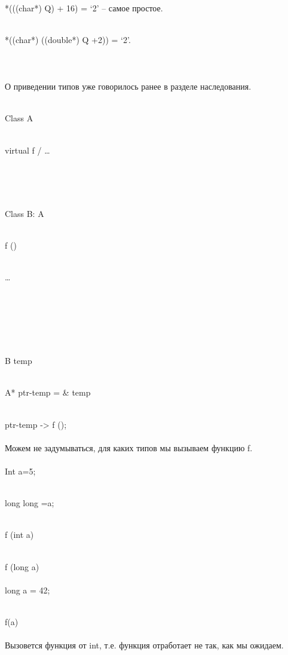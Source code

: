 \documentclass[a4paper,10pt]{article}
\begin{document}
\\*(((char*) Q) + 16) = ‘2’ – самое простое.

\\*((char*) ((double*) Q +2)) = ‘2’.
\\
\\
\\

\\О приведении типов уже говорилось ранее в разделе наследования. 

\\Class A {

\\virtual f / {…}

\\}
\\

\\Class B: A {

\\f () {

\\…

\\}

\\}
\\

\\B temp

\\A* ptr-temp = & temp

\\ptr-temp -> f ();
\\

\\Можем не задумываться, для каких типов мы вызываем функцию f. 
\\

\\Int a=5;

\\long long =a;

\\f (int a)

\\f (long a)
\\


\\long a = 42;

\\f(a)
\\

\\Вызовется функция от int, т.е. функция отработает не так, как мы ожидаем. 
\\
\end{document}
